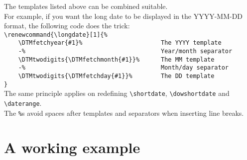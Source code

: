 \documentclass[11pt]{ltxdoc}
\begin{document}
	\bigskip
	The templates listed above can be combined suitable. \\
	For example, if you want the long date to be displayed in the \textsf{YYYY-MM-DD} format, the following code does the trick: \\
	\verb|\renewcommand{\longdate}[1]{%| \\\nopagebreak[4]
	\verb|    \DTMfetchyear{#1}%                      The YYYY template| \\\nopagebreak[4]
	\verb|    -%                                      Year/month separator| \\\nopagebreak[4]
	\verb|    \DTMtwodigits{\DTMfetchmonth{#1}}%      The MM template| \\\nopagebreak[4]
	\verb|    -%                                      Month/day separator| \\\nopagebreak[4]
	\verb|    \DTMtwodigits{\DTMfetchday{#1}}%        The DD template| \\\nopagebreak[4]
	\verb|}| \\
	
	\smallskip
	The same principle applies on redefining \verb|\shortdate|, \verb|\dowshortdate| and \verb|\daterange|. \\
	The \verb|%|s avoid spaces after templates and separators when inserting line breaks.
	
	
	
	\section{A working example}
\end{document}

